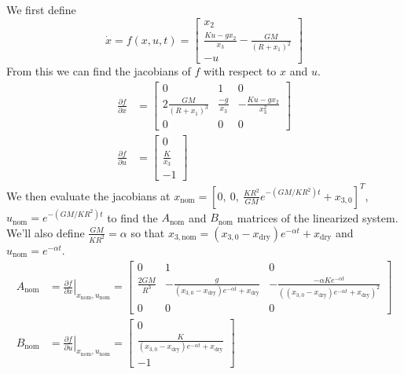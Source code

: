 \documentclass[11pt]{article}
\begin{document}
\subparagraph*{}
We first define
\begin{equation*}
	\dot{x} = f(x,u,t) = \begin{bmatrix} x_2 \\ \frac{Ku-gx_2}{x_3} - \frac{GM}{(R+x_1)^2} \\ -u \end{bmatrix}
\end{equation*}
From this we can find the jacobians of $f$ with respect to $x$ and $u$.
\begin{align*}
	\frac{\partial f}{\partial x} &= \begin{bmatrix} 0 & 1 & 0 \\ 2\frac{GM}{(R+x_1)^3} & \frac{-g}{x_3} & -\frac{Ku-gx_2}{x_3^2} \\ 0 & 0 & 0 \end{bmatrix} \\
	\frac{\partial f}{\partial u} &= \begin{bmatrix} 0 \\ \frac{K}{x_3} \\ -1 \end{bmatrix}
\end{align*}
We then evaluate the jacobians at $x_{\text{nom}} = [0,\ 0,\ \frac{KR^2}{GM}e^{-(GM/KR^2)t} + x_{3,0}]^T$, $u_{\text{nom}}=e^{-(GM/KR^2)t}$ to find the $A_\text{nom}$ and $B_\text{nom}$ matrices of the linearized system. We'll also define $\frac{GM}{KR^2} = \alpha$ so that $x_{3,\text{nom}} = (x_{3,0}-x_\text{dry})e^{-\alpha t} + x_\text{dry}$ and $u_\text{nom} = e^{-\alpha t}$. 
\begin{align*}
	A_\text{nom} &= \left. \frac{\partial f}{\partial x} \right |_{x_{\text{nom}},u_{\text{nom}}} = \begin{bmatrix} 0 & 1 & 0 \\ \frac{2GM}{R^3} & -\frac{g}{(x_{3,0}-x_\text{dry})e^{-\alpha t} + x_\text{dry}} & -\frac{-\alpha Ke^{-\alpha t}}{((x_{3,0}-x_\text{dry})e^{-\alpha t} + x_\text{dry})^2} \\ 0 & 0 & 0 \end{bmatrix} \\
	B_\text{nom} &= \left. \frac{\partial f}{\partial u} \right |_{x_{\text{nom}},u_{\text{nom}}} = \begin{bmatrix} 0 \\ \frac{K}{(x_{3,0}-x_\text{dry})e^{-\alpha t} + x_\text{dry}} \\ -1 \end{bmatrix}
\end{align*}
\end{document}

